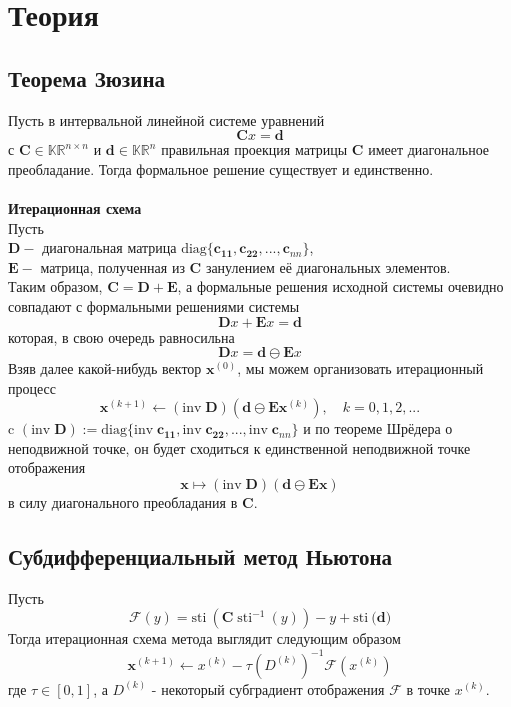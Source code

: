 \section{Теория}
\subsection{Теорема Зюзина}
Пусть в интервальной линейной системе уравнений 
\begin{equation}
\mathbf{C}x = \mathbf{d}    
\end{equation}
с $\mathbf{C}\in \mathbb{KR}^{n\times n}$ и $\mathbf{d}\in\mathbb{KR}^{n} $ правильная проекция матрицы $\mathbf{C}$ имеет диагональное преобладание. Тогда формальное решение существует и единственно.\\
\\
\textbf{Итерационная схема}\\
Пусть\\
$\mathbf{D} -$ диагональная матрица $\mathrm{diag}\{\mathbf{c_{11}},\mathbf{c_{22}},...,\mathbf{c}_{nn}\}$,\\
$\mathbf{E} -$ матрица, полученная из $\mathbf{C}$ занулением её диагональных элементов.\\
Таким образом, $\mathbf{C}=\mathbf{D}+\mathbf{E}$, а формальные решения исходной системы очевидно совпадают с формальными решениями системы
\begin{equation}
    \mathbf{D}x+\mathbf{E}x=\mathbf{d}
\end{equation}
которая, в свою очередь равносильна
\begin{equation}
    \mathbf{D}x=\mathbf{d}\ominus\mathbf{E}x
\end{equation}
Взяв далее какой-нибудь вектор $\mathbf{x}^{(0)}$, мы можем организовать итерационный процесс
\begin{equation}
    \mathbf{x}^{(k+1)}\leftarrow\left(\mathrm{inv}\;\mathbf{D}\right)\left(\mathbf{d}\ominus\mathbf{E}\mathbf{x}^{(k)}\right), \quad k=0,1,2,...
\end{equation}
c $\left(\mathrm{inv}\;\mathbf{D}\right):=\mathrm{diag}\{\mathrm{inv}\;\mathbf{c_{11}},\mathrm{inv}\;\mathbf{c_{22}},...,\mathrm{inv}\;\mathbf{c}_{nn}\}$ и по теореме Шрёдера о неподвижной точке, он будет сходиться к единственной неподвижной точке отображения
\begin{equation}
    \mathbf{x}\mapsto\left(\mathrm{inv}\;\mathbf{D}\right)\left(\mathbf{d}\ominus\mathbf{E}\mathbf{x}\right)
\end{equation}
в силу диагонального преобладания в $\mathbf{C}$.
\subsection{Субдифференциальный метод Ньютона}
Пусть
\begin{equation}
    \mathcal{F}(y)=\mathrm{sti}\:(\mathbf{C}\;\mathrm{sti}^{-1}\:(y))-y+\mathrm{sti}\:(\mathbf{d)}
\end{equation}
Тогда итерационная схема метода выглядит следующим образом
\begin{equation}
    \mathbf{x}^{(k+1)}\leftarrow x^{(k)}-\tau\left(D^{(k)}\right)^{-1}\mathcal{F}(x^{(k)})
\end{equation}
где $\tau\in[0,1]$, а $D^{(k)}$ - некоторый субградиент отображения $\mathcal{F}$ в точке $x^{(k)}$.